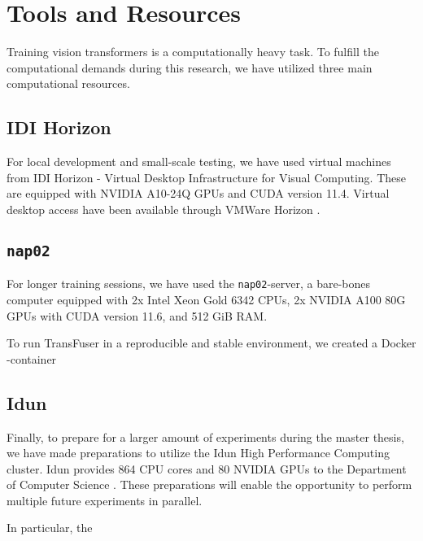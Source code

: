 \section{Tools and Resources}

Training vision transformers is a computationally heavy task.
To fulfill the computational demands during this research,
we have utilized three main computational resources.


\subsection{IDI Horizon}

For local development and small-scale testing,
we have used virtual machines from
IDI Horizon - Virtual Desktop Infrastructure for Visual Computing.
These are equipped with NVIDIA A10-24Q GPUs and CUDA version 11.4.
Virtual desktop access have been available through VMWare Horizon \cite{software:vmware:horizon}.


\subsection{\texttt{nap02}}

For longer training sessions,
we have used the \texttt{nap02}-server,
a bare-bones computer equipped with
2x Intel Xeon Gold 6342 CPUs,
2x NVIDIA A100 80G GPUs with CUDA version 11.6,
and 512 GiB RAM.

To run TransFuser in a reproducible and stable environment,
we created a Docker \cite{docker}-container 


\subsection{Idun}

Finally,
to prepare for a larger amount of experiments during the master thesis,
we have made preparations to utilize the Idun High Performance Computing cluster.
Idun provides 864 CPU cores and 80 NVIDIA GPUs to the Department of Computer Science \cite{idun:overview}.
These preparations will enable the opportunity to perform multiple future experiments in parallel.

In particular, the 



